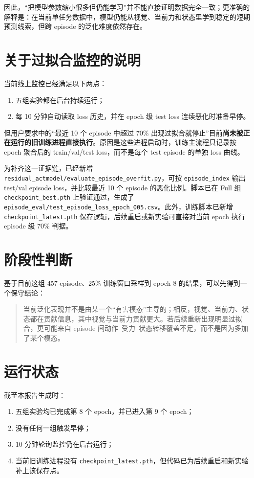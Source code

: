 \documentclass[UTF8,a4paper,11pt,fontset=none]{ctexart}
\begin{document}
因此，“把模型参数缩小很多但仍能学习”并不能直接证明数据完全一致；更准确的解释是：在当前单任务数据中，模型仍能从视觉、当前力和状态里学到稳定的短期预测线索，但跨 episode 的泛化难度依然存在。

\section{关于过拟合监控的说明}
当前线上监控已经满足以下两点：
\begin{enumerate}
\item 五组实验都在后台持续运行；
\item 每 10 分钟自动读取 loss 历史，并在 epoch 级 test loss 连续恶化时准备早停。
\end{enumerate}

但用户要求中的“最近 10 个 episode 中超过 70\% 出现过拟合就停止”目前\textbf{尚未被正在运行的旧训练进程直接执行}。原因是这些进程启动时，训练主流程只记录按 epoch 聚合后的 train/val/test loss，而不是每个 test episode 的单独 loss 曲线。

为补齐这一证据链，已经新增 \texttt{residual\_actmodel/evaluate\_episode\_overfit.py}，可按 \texttt{episode\_index} 输出 test/val episode loss，并比较最近 10 个 episode 的恶化比例。脚本已在 Full 组 \texttt{checkpoint\_best.pth} 上验证通过，生成了 \texttt{episode\_eval/test\_episode\_loss\_epoch\_005.csv}。此外，训练脚本已新增 \texttt{checkpoint\_latest.pth} 保存逻辑，后续重启或新实验可直接对当前 epoch 执行 episode 级 70\% 判据。

\section{阶段性判断}
基于目前这组 457-episode、25\% 训练窗口采样到 epoch 8 的结果，可以先得到一个保守结论：

\begin{quote}
\colorbox{bluegray}{\parbox{0.92\textwidth}{
当前泛化表现并不是由某一个“有害模态”主导的；相反，视觉、当前力、状态都在贡献信息，其中视觉与当前力贡献更大。若后续重新出现明显过拟合，更可能来自 episode 间动作--受力--状态转移覆盖不足，而不是因为多加了某个模态。}}
\end{quote}

\section{运行状态}
截至本报告生成时：
\begin{enumerate}
\item 五组实验均已完成第 8 个 epoch，并已进入第 9 个 epoch；
\item 没有任何一组触发早停；
\item 10 分钟轮询监控仍在后台运行；
\item 当前旧训练进程没有 \texttt{checkpoint\_latest.pth}，但代码已为后续重启和新实验补上该保存点。
\end{enumerate}
\end{document}
